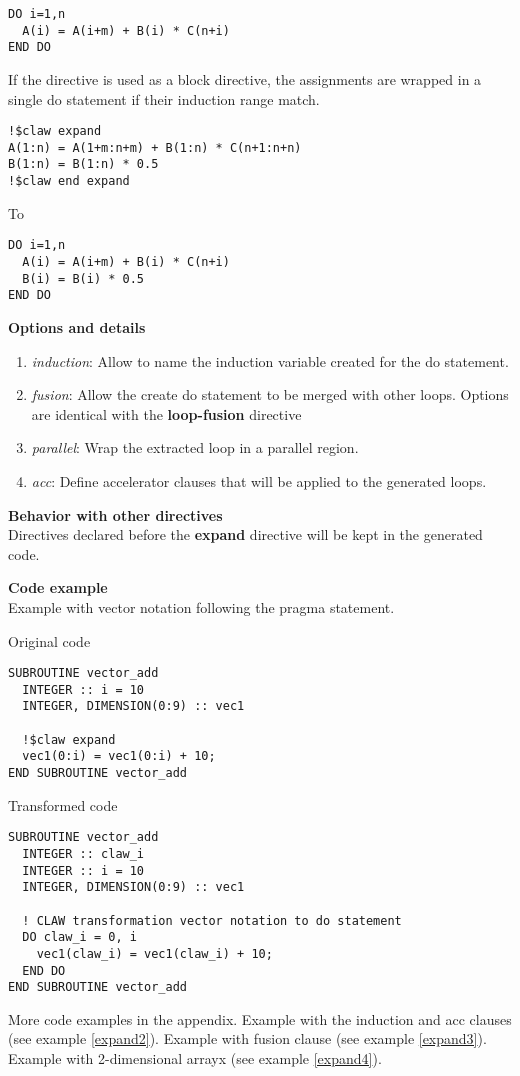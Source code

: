 \begin{lstlisting}
DO i=1,n
  A(i) = A(i+m) + B(i) * C(n+i)
END DO
\end{lstlisting}

If the directive is used as a block directive, the assignments are wrapped in
a single do statement if their induction range match.

\begin{lstlisting}
!$claw expand
A(1:n) = A(1+m:n+m) + B(1:n) * C(n+1:n+n)
B(1:n) = B(1:n) * 0.5
!$claw end expand
\end{lstlisting}

To

\begin{lstlisting}
DO i=1,n
  A(i) = A(i+m) + B(i) * C(n+i)
  B(i) = B(i) * 0.5
END DO
\end{lstlisting}


\textbf{Options and details}
\begin{enumerate}
\item \textit{induction}: Allow to name the induction variable created for the
do statement.
\item \textit{fusion}: Allow the create do statement to be merged with other
loops. Options
are identical with the \textbf{loop-fusion} directive
\item \textit{parallel}: Wrap the extracted loop in a parallel region.
\item \textit{acc}: Define accelerator clauses that will be applied to the
generated loops.
\end{enumerate}

\textbf{Behavior with other directives}\\
Directives declared before the \textbf{expand} directive will be kept
in the generated code.

\textbf{Code example}\\
\label{expand1}
Example with vector notation following the pragma statement.

Original code
\begin{lstlisting}
SUBROUTINE vector_add
  INTEGER :: i = 10
  INTEGER, DIMENSION(0:9) :: vec1

  !$claw expand
  vec1(0:i) = vec1(0:i) + 10;
END SUBROUTINE vector_add
\end{lstlisting}

Transformed code
\begin{lstlisting}
SUBROUTINE vector_add
  INTEGER :: claw_i
  INTEGER :: i = 10
  INTEGER, DIMENSION(0:9) :: vec1

  ! CLAW transformation vector notation to do statement
  DO claw_i = 0, i
    vec1(claw_i) = vec1(claw_i) + 10;
  END DO
END SUBROUTINE vector_add
\end{lstlisting}

More code examples in the appendix. Example with the induction and acc clauses
(see example \ref{expand2}). Example with fusion clause (see example
\ref{expand3}). Example with 2-dimensional arrayx (see example
\ref{expand4}).
